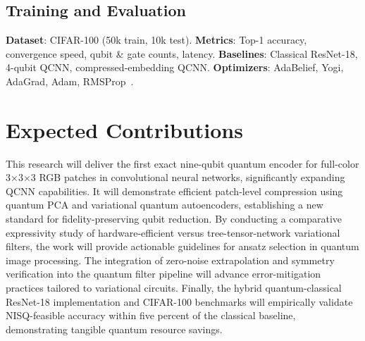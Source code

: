 \documentclass[onecolumn,12pt]{IEEEtran}
\begin{document}
\subsection{Training and Evaluation}
\textbf{Dataset}: CIFAR-100 (50k train, 10k test).  
\textbf{Metrics}: Top-1 accuracy, convergence speed, qubit \& gate counts, latency.  
\textbf{Baselines}: Classical ResNet-18, 4-qubit QCNN, compressed‐embedding QCNN.  
\textbf{Optimizers}: AdaBelief, Yogi, AdaGrad, Adam, RMSProp~\cite{zhuang2020adabelief,ceschini2025quanvnn}.

\section{Expected Contributions}
This research will deliver the first exact nine-qubit quantum encoder for full-color 3×3×3 RGB patches in convolutional neural networks, significantly expanding QCNN capabilities. It will demonstrate efficient patch‐level compression using quantum PCA and variational quantum autoencoders, establishing a new standard for fidelity-preserving qubit reduction. By conducting a comparative expressivity study of hardware-efficient versus tree-tensor-network variational filters, the work will provide actionable guidelines for ansatz selection in quantum image processing. The integration of zero-noise extrapolation and symmetry verification into the quantum filter pipeline will advance error-mitigation practices tailored to variational circuits. Finally, the hybrid quantum-classical ResNet-18 implementation and CIFAR-100 benchmarks will empirically validate NISQ-feasible accuracy within five percent of the classical baseline, demonstrating tangible quantum resource savings.
\end{document}
